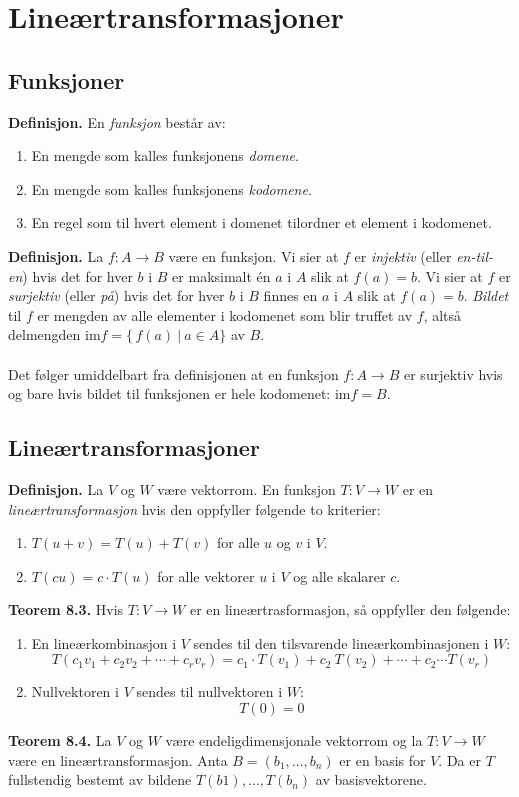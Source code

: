\documentclass{article}
\begin{document}
\clearpage
\section{Lineærtransformasjoner}


\subsection{Funksjoner}
\textbf{Definisjon.} En \textit{funksjon} består av:
\begin{enumerate}
    \item En mengde som kalles funksjonens \textit{domene}.
    \item En mengde som kalles funksjonens \textit{kodomene}.
    \item En regel som til hvert element i domenet tilordner et element i kodomenet.
\end{enumerate}
\textbf{Definisjon.} La $f: A \rightarrow B$ være en funksjon. Vi sier at $f$ er \textit{injektiv} (eller \textit{en-til-en}) hvis det for hver $b$ i $B$ er maksimalt én $a$ i $A$ slik at $f(a) = b$. Vi sier at $f$ er \textit{surjektiv} (eller \textit{på}) hvis det for hver $b$ i $B$ finnes en $a$ i $A$ slik at $f(a) = b$. \textit{Bildet} til $f$ er mengden av alle elementer i kodomenet som blir truffet av $f$, altså delmengden $\text{im} f = \{\, f(a) \ | \ a \in A \}$ av $B$.
\\\\
Det følger umiddelbart fra definisjonen at en funksjon $f: A \rightarrow B$ er surjektiv hvis og bare hvis bildet til funksjonen er hele kodomenet: $\text{im} f = B$.


\subsection{Lineærtransformasjoner}
\textbf{Definisjon.} La $V$ og $W$ være vektorrom. En funksjon $T: V \rightarrow W$ er en \textit{lineærtransformasjon} hvis den oppfyller følgende to kriterier:
\begin{enumerate}
    \item $T(u + v) = T(u) + T(v)$ for alle $u$ og $v$ i $V$.
    \item $T(cu) = c \cdot T(u)$ for alle vektorer $u$ i $V$ og alle skalarer $c$.
\end{enumerate}
\textbf{Teorem 8.3.} Hvis $T: V \rightarrow W$ er en lineærtrasformasjon, så oppfyller den følgende:
\begin{enumerate}
    \item En lineærkombinasjon i $V$ sendes til den tilsvarende lineærkombinasjonen i $W$:
    \[T(c_1v_1 + c_2v_2 + \cdots + c_rv_r) = c_1 \cdot T(v_1) + c_2 \ T(v_2) + \cdots + c_2 \cdots T(v_r) \]
    \item Nullvektoren i $V$ sendes til nullvektoren i $W$: \[ T(0) = 0 \]
\end{enumerate}
\textbf{Teorem 8.4.} La $V$ og $W$ være endeligdimensjonale vektorrom og la $T: V \rightarrow W$ være en lineærtransformasjon. Anta $B = (b_1, \dots, b_n)$ er en basis for $V$. Da er $T$ fullstendig bestemt av bildene $T(b1), \dots, T(b_n)$ av basisvektorene.
\end{document}
